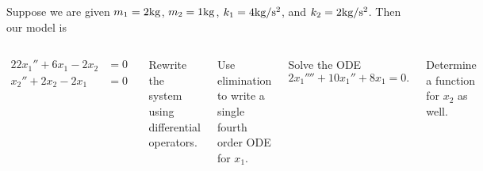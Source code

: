 \begin{applicationActivities}
\begin{activity}{30}
Suppose we are given \(m_1=2 {\rm kg}\), \(m_2=1 {\rm kg}\), \(k_1 = 4 {\rm kg/s^2}\), and \(k_2 = 2 {\rm kg/s^2}\).  Then our model is
\vfill
\begin{columns}
\springdoublemass[1]
\begin{alignat*}
2 2x_1''+6x_1-2x_2 &= 0 \\
x_2''+2x_2-2x_1 &= 0 
\end{alignat*}
\vfill
\begin{subactivity}
Rewrite the system using differential operators.
\end{subactivity}
\begin{subactivity}
Use elimination to write a single fourth order ODE for \(x_1\).
\end{subactivity}
\begin{subactivity}
Solve the ODE \[2x_1''''+10x_1''+8x_1 = 0 .\] 
\end{subactivity}
\begin{subactivity}
Determine a function for \(x_2\) as well. 
\end{subactivity}
\vfill
\end{columns}
\end{activity}

\end{applicationActivities}
